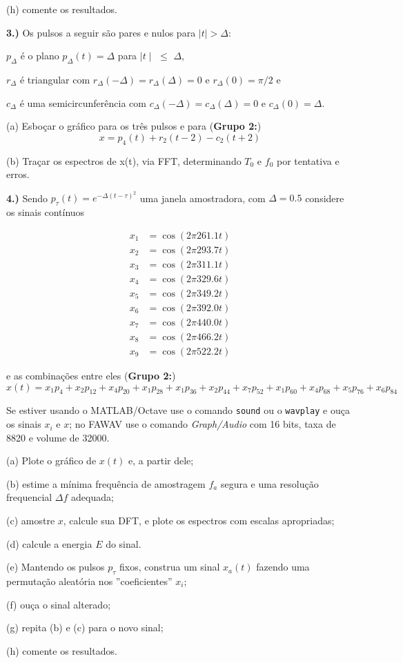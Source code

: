 \documentclass[10pt]{article}
\begin{document}
(h) comente os resultados.


\vspace{\baselineskip}


\textbf{3.)} Os pulsos a seguir são pares e nulos para $\mid t \mid > \Delta$:

$p_{\Delta}$ é o plano $p_{\Delta}(t) = \Delta$ para $\mid t \mid\,\,\leq\,\, \Delta$,

$r_{\Delta}$ é triangular com $r_{\Delta}(-\Delta) = r_{\Delta}(\Delta) = 0$ e $r_{\Delta}(0) = \pi / 2$ e

$c_{\Delta}$ é uma semicircunferência com $c_{\Delta}(-\Delta) = c_{\Delta}(\Delta) = 0$ e $c_{\Delta}(0) = \Delta$.

(a) Esboçar o gráfico para os três pulsos e para (\textbf{Grupo 2:})
\[x = p_4(t) + r_2(t - 2) - c_2(t + 2)\]

(b) Traçar os espectros de x(t), via FFT, determinando $T_0$ e $f_0$ por tentativa e erros.


\vspace{\baselineskip}


\textbf{4.)} Sendo $p_{\tau}(t) = e^{-\Delta (t - \tau)^2}$ uma janela amostradora, com $\Delta = 0.5$ considere os sinais contínuos

\begin{flushleft}
\begin{align*}
    x_1 &= \cos(2 \pi 261.1 t)\\
    x_2 &= \cos(2 \pi 293.7 t)\\
    x_3 &= \cos(2 \pi 311.1 t)\\
    x_4 &= \cos(2 \pi 329.6 t)\\
    x_5 &= \cos(2 \pi 349.2 t)\\
    x_6 &= \cos(2 \pi 392.0 t)\\
    x_7 &= \cos(2 \pi 440.0 t)\\
    x_8 &= \cos(2 \pi 466.2 t)\\
    x_9 &= \cos(2 \pi 522.2 t)
\end{align*}
\end{flushleft}
e as combinações entre eles (\textbf{Grupo 2:})
\[x(t) = x_1p_4 + x_2p_{12} + x_4p_{20} + x_1p_{28} + x_1p_{36} + x_2p_{44} + x_7p_{52} + x_1p_{60} + x_4p_{68} + x_5p_{76} + x_6p_{84}\]

Se estiver usando o MATLAB/Octave use o comando \texttt{sound} ou o \texttt{wavplay} e ouça os sinais $x_i$ e $x$; no FAWAV use o comando \emph{Graph/Audio} com 16 bits, taxa de 8820 e volume de 32000.

(a) Plote o gráfico de $x(t)$ e, a partir dele;

(b) estime a mínima frequência de amostragem $f_a$ segura e uma resolução frequencial $\Delta f$ adequada;

(c) amostre $x$, calcule sua DFT, e plote os espectros com escalas apropriadas;

(d) calcule a energia $E$ do sinal.

(e) Mantendo os pulsos $p_{\tau}$ fixos, construa um sinal $x_a(t)$ fazendo uma permutação aleatória nos ''coeficientes'' $x_i$;

(f) ouça o sinal alterado;

(g) repita (b) e (c) para o novo sinal;

(h) comente os resultados.
\end{document}
